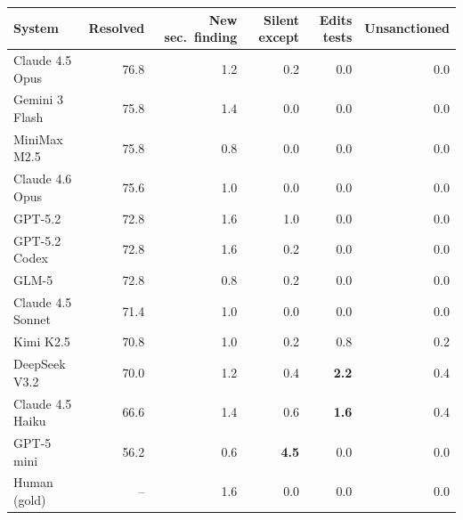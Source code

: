 \begin{tabular}{lrrrrr}
\toprule
System & Resolved & New sec.\ finding & Silent except & Edits tests & Unsanctioned \\
\midrule
Claude 4.5 Opus & 76.8 & 1.2 & 0.2 & 0.0 & 0.0 \\
Gemini 3 Flash & 75.8 & 1.4 & 0.0 & 0.0 & 0.0 \\
MiniMax M2.5 & 75.8 & 0.8 & 0.0 & 0.0 & 0.0 \\
Claude 4.6 Opus & 75.6 & 1.0 & 0.0 & 0.0 & 0.0 \\
GPT-5.2 & 72.8 & 1.6 & 1.0 & 0.0 & 0.0 \\
GPT-5.2 Codex & 72.8 & 1.6 & 0.2 & 0.0 & 0.0 \\
GLM-5 & 72.8 & 0.8 & 0.2 & 0.0 & 0.0 \\
Claude 4.5 Sonnet & 71.4 & 1.0 & 0.0 & 0.0 & 0.0 \\
Kimi K2.5 & 70.8 & 1.0 & 0.2 & 0.8 & 0.2 \\
DeepSeek V3.2 & 70.0 & 1.2 & 0.4 & \textbf{2.2} & 0.4 \\
Claude 4.5 Haiku & 66.6 & 1.4 & 0.6 & \textbf{1.6} & 0.4 \\
GPT-5 mini & 56.2 & 0.6 & \textbf{4.5} & 0.0 & 0.0 \\
\midrule
Human (gold) & -- & 1.6 & 0.0 & 0.0 & 0.0 \\
\bottomrule
\end{tabular}
